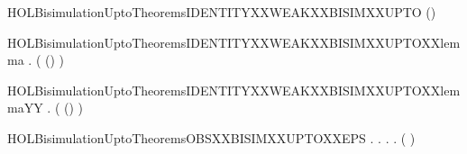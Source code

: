 \newcommand{\HOLBisimulationUptoTheoremsIDENTITYXXSTRONGXXBISIMXXUPTOXXlemma}{\UseVerbatim{HOLBisimulationUptoTheoremsIDENTITYXXSTRONGXXBISIMXXUPTOXXlemma}}
\begin{SaveVerbatim}{HOLBisimulationUptoTheoremsIDENTITYXXWEAKXXBISIMXXUPTO}
\HOLTokenTurnstile{}  (\HOLSymConst{=})
\end{SaveVerbatim}
\newcommand{\HOLBisimulationUptoTheoremsIDENTITYXXWEAKXXBISIMXXUPTO}{\UseVerbatim{HOLBisimulationUptoTheoremsIDENTITYXXWEAKXXBISIMXXUPTO}}
\begin{SaveVerbatim}{HOLBisimulationUptoTheoremsIDENTITYXXWEAKXXBISIMXXUPTOXXlemma}
\HOLTokenTurnstile{} \HOLSymConst{\HOLTokenForall{}}. (  (\HOLSymConst{=})  )  
\end{SaveVerbatim}
\newcommand{\HOLBisimulationUptoTheoremsIDENTITYXXWEAKXXBISIMXXUPTOXXlemma}{\UseVerbatim{HOLBisimulationUptoTheoremsIDENTITYXXWEAKXXBISIMXXUPTOXXlemma}}
\begin{SaveVerbatim}{HOLBisimulationUptoTheoremsIDENTITYXXWEAKXXBISIMXXUPTOXXlemmaYY}
\HOLTokenTurnstile{} \HOLSymConst{\HOLTokenForall{}}. (  (\HOLSymConst{=})  )  
\end{SaveVerbatim}
\newcommand{\HOLBisimulationUptoTheoremsIDENTITYXXWEAKXXBISIMXXUPTOXXlemmaYY}{\UseVerbatim{HOLBisimulationUptoTheoremsIDENTITYXXWEAKXXBISIMXXUPTOXXlemmaYY}}
\begin{SaveVerbatim}{HOLBisimulationUptoTheoremsOBSXXBISIMXXUPTOXXEPS}
\HOLTokenTurnstile{} \HOLSymConst{\HOLTokenForall{}}.
         \HOLSymConst{\HOLTokenImp{}}
       \HOLSymConst{\HOLTokenForall{}} .
              \HOLSymConst{\HOLTokenImp{}}
           \HOLSymConst{\HOLTokenForall{}}.
                  \HOLSymConst{\HOLTokenImp{}}
               \HOLSymConst{\HOLTokenExists{}}.
                      \HOLSymConst{\HOLTokenConj{}}
                   (    )  
\end{SaveVerbatim}
